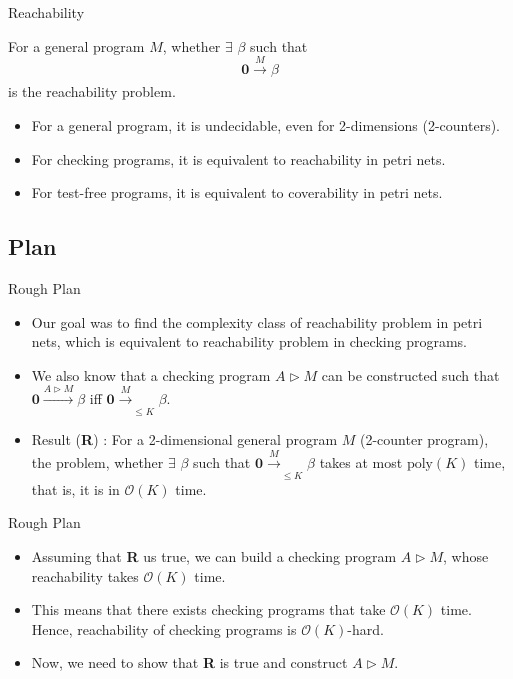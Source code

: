 \documentclass{beamer}
\renewcommand{\b}[1]{\boldsymbol{#1}}
\newcommand{\zero}[0]{\b{0}}
\newcommand{\prog}[1]{\xrightarrow[]{#1}}
\begin{document}
\begin{frame}{Reachability}

    For a general program $M$, whether $\exists$ $\beta$ such that 
    $$\zero \prog{M} \beta$$
    is the reachability problem.

    \begin{itemize}
        \item For a general program, it is undecidable, even for 2-dimensions (2-counters).
        \item For checking programs, it is equivalent to reachability in petri nets.
        \item For test-free programs, it is equivalent to coverability in petri nets.
    \end{itemize}

\end{frame}

\subsection{Plan}
\begin{frame}{Rough Plan}
    \begin{itemize}
        \item Our goal was to find the complexity class of reachability problem in petri nets, which is equivalent to reachability problem in checking programs.

        \item We also know that a checking program $A\triangleright M$ can be constructed such that $\zero \prog{A\triangleright M} \beta$ iff $\zero \prog{M}_{\leq K} \beta$.

        \item Result (\textbf{R}) : For a 2-dimensional general program $M$ (2-counter program), the problem, 
        whether $\exists$ $\beta$ such that $\zero \prog{M}_{\leq K} \beta $ takes at most $\text{poly}(K)$ time, that is, it is in $\mathcal{O}(K)$ time.
    \end{itemize}
\end{frame}

\begin{frame}{Rough Plan}
    \begin{itemize}
        \item Assuming that \textbf{R} us true, we can build a checking program $A\triangleright M$, whose reachability takes $\mathcal{O}( K)$ time.
        \item This means that there exists checking programs that take $\mathcal{O}(K)$ time. Hence, reachability of checking programs is  $\mathcal{O}(K)$-hard.
        \item Now, we need to show that \textbf{R} is true and construct $A\triangleright M$.
    \end{itemize}
\end{frame}
\end{document}
